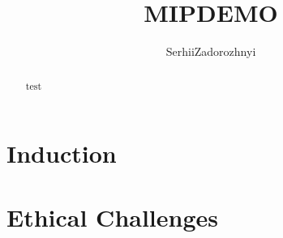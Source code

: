 \documentclass{article}
\title{MIP\;DEMO}
\author{Serhii\;Zadorozhnyi}
\begin{document}
\maketitle

\begin{abstract}
test\cite{9904386}
\end{abstract}

\section{Induction}
\section{Ethical Challenges}




\end{document}
